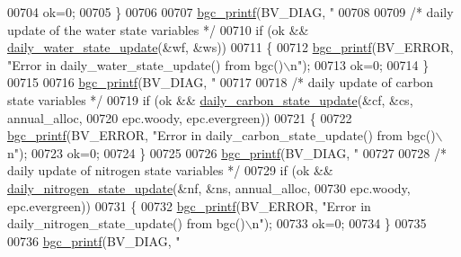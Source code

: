 \begin{DoxyCode}
{{{{{{{{{{{{{{{{{{{{{00704                 ok=0;
00705             \}
00706             
00707             \hyperlink{bgc__io_8c_af287cce6e2aede1ce337de9319e80d0d}{bgc\_printf}(BV\_DIAG, \textcolor{stringliteral}{"%
00708 
00709             \textcolor{comment}{/* daily update of the water state variables */}
00710             \textcolor{keywordflow}{if} (ok && \hyperlink{state__update_8c_a7107f4defb131263ebb760ecf8423ab6}{daily\_water\_state\_update}(&wf, &ws))
00711             \{
00712                 \hyperlink{bgc__io_8c_af287cce6e2aede1ce337de9319e80d0d}{bgc\_printf}(BV\_ERROR, \textcolor{stringliteral}{"Error in daily\_water\_state\_update() from bgc()\(\backslash\)n"});
00713                 ok=0;
00714             \}
00715             
00716             \hyperlink{bgc__io_8c_af287cce6e2aede1ce337de9319e80d0d}{bgc\_printf}(BV\_DIAG, \textcolor{stringliteral}{"%
00717 
00718             \textcolor{comment}{/* daily update of carbon state variables */}
00719             \textcolor{keywordflow}{if} (ok && \hyperlink{state__update_8c_ab0adc8a68a22b97c1eba81f5da03d555}{daily\_carbon\_state\_update}(&cf, &cs, annual\_alloc,
00720                 epc.woody, epc.evergreen))
00721             \{
00722                 \hyperlink{bgc__io_8c_af287cce6e2aede1ce337de9319e80d0d}{bgc\_printf}(BV\_ERROR, \textcolor{stringliteral}{"Error in daily\_carbon\_state\_update() from bgc()\(\backslash\)n"});
00723                 ok=0;
00724             \}
00725 
00726             \hyperlink{bgc__io_8c_af287cce6e2aede1ce337de9319e80d0d}{bgc\_printf}(BV\_DIAG, \textcolor{stringliteral}{"%
00727 
00728             \textcolor{comment}{/* daily update of nitrogen state variables */}
00729             \textcolor{keywordflow}{if} (ok && \hyperlink{state__update_8c_aac44819d8b0419079683705a5a220e7a}{daily\_nitrogen\_state\_update}(&nf, &ns, annual\_alloc,
00730                 epc.woody, epc.evergreen))
00731             \{
00732                 \hyperlink{bgc__io_8c_af287cce6e2aede1ce337de9319e80d0d}{bgc\_printf}(BV\_ERROR, \textcolor{stringliteral}{"Error in daily\_nitrogen\_state\_update() from bgc()\(\backslash\)n"});
00733                 ok=0;
00734             \}
00735             
00736             \hyperlink{bgc__io_8c_af287cce6e2aede1ce337de9319e80d0d}{bgc\_printf}(BV\_DIAG, \textcolor{stringliteral}{"%
}}}}}}}}}}}}}}}}}}}}}}}}}
\end{DoxyCode}
